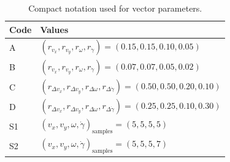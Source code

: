 \begin{table}[H]
\centering
\caption{Compact notation used for vector parameters.}
\label{tab:mpcc_vector_parameters}
\scriptsize
\setlength{\tabcolsep}{4pt}
\renewcommand{\arraystretch}{0.90}
\begin{tabular}{ll}
\toprule
\textbf{Code} & \textbf{Values} \\
\midrule
A & \((r_{v_x}, r_{v_y}, r_{\omega}, r_{\dot{\gamma}})=(0.15,0.15,0.10,0.05)\) \\
B & \((r_{v_x}, r_{v_y}, r_{\omega}, r_{\dot{\gamma}})=(0.07,0.07,0.05,0.02)\) \\
C & \((r_{\Delta v_x}, r_{\Delta v_y}, r_{\Delta \omega}, r_{\Delta\dot{\gamma}})=(0.50,0.50,0.20,0.10)\) \\
D & \((r_{\Delta v_x}, r_{\Delta v_y}, r_{\Delta \omega}, r_{\Delta\dot{\gamma}})=(0.25,0.25,0.10,0.30)\) \\
S1 & \((v_x,v_y,\omega,\dot{\gamma})_{\mathrm{samples}}=(5,5,5,5)\) \\
S2 & \((v_x,v_y,\omega,\dot{\gamma})_{\mathrm{samples}}=(5,5,5,7)\) \\
\bottomrule
\end{tabular}
\end{table}

